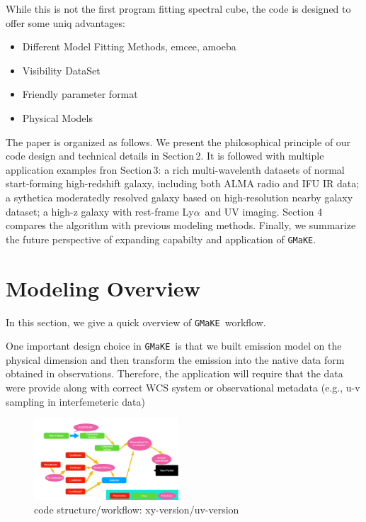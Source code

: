 \documentclass[twocolumn,tighten]{aastex62}
\newcommand{\lya}{\mbox{\rm Ly$\alpha$}}
\newcommand{\gmake}{{\tt GMaKE}}
\begin{document}
While this is not the first program fitting spectral cube, the code is designed to offer some uniq advantages:

\begin{itemize}
\item Different Model Fitting Methods, emcee, amoeba
\item Visibility DataSet
\item Friendly parameter format
\item Physical Models
\end{itemize}

The paper is organized as follows.
We present the philosophical principle of our code design and technical details in Section\,2. It is followed with multiple application examples fron Section\,3: a rich multi-wavelenth datasets of normal start-forming high-redshift galaxy, including both ALMA radio and IFU IR data; a sythetica moderatedly resolved galaxy based on high-resolution nearby galaxy dataset; a high-z galaxy with rest-frame \lya\ and UV imaging. Section 4 compares the algorithm with previous modeling methods. Finally, we summarize the future perspective of expanding capabilty and application of \gmake. 



\section{Modeling Overview}


In this section, we give a quick overview of \gmake\ workflow.

One important design choice in \gmake\ is that we built emission model on the physical dimension and then transform the emission into the native data form obtained in observations. 
Therefore, the application will require that the data were provide along with correct WCS system or observational metadata (e.g., u-v sampling in interfemeteric data)

\begin{figure}%
\centering
\includegraphics[width=0.48\textwidth]{figures/pipeline-workflow-im.pdf}
\caption{code structure/workflow: xy-version/uv-version
\label{fig:spec}
}
\end{figure}
\end{document}
